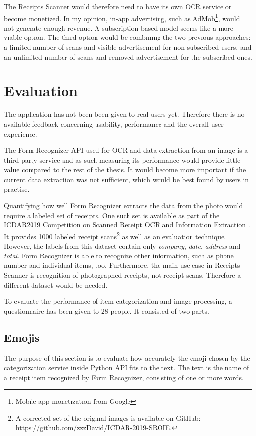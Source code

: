 \documentclass[
  digital, %
  table,   %
  oneside, %
  lof,     %
  lot,     %
]{fithesis3}
\begin{document}
The Receipts Scanner would therefore need to have its own OCR service or become monetized. In my opinion, in-app advertising, such as AdMob\footnote{Mobile app monetization from Google}, would not generate enough revenue. A subscription-based model seems like a more viable option. The third option would be combining the two previous approaches: a limited number of scans and visible advertisement for non-subscribed users, and an unlimited number of scans and removed advertisement for the subscribed ones.

\chapter{Evaluation}
The application has not been been given to real users yet. Therefore there is no available feedback concerning usability, performance and the overall user experience.

The Form Recognizer API used for OCR and data extraction from an image is a third party service and as such measuring its performance would provide little value compared to the rest of the thesis. It would become more important if the current data extraction was not sufficient, which would be best found by users in practise. 

Quantifying how well Form Recognizer extracts the data from the photo would require a labeled set of receipts. One such set is available as part of the ICDAR2019 Competition on Scanned Receipt OCR
and Information Extraction \cite{Huang2019ICDAR}. It provides \num{1000} labeled receipt scans\footnote{A corrected set of the original images is available on GitHub: \url{https://github.com/zzzDavid/ICDAR-2019-SROIE}.} as well as an evaluation technique. However, the labels from this dataset contain only \textit{company}, \textit{date}, \textit{address} and \textit{total}. Form Recognizer is able to recognize other information, such as phone number and individual items, too. Furthermore, the main use case in Receipts Scanner is recognition of photographed receipts, not receipt scans. Therefore a different dataset would be needed.

To evaluate the performance of item categorization and image processing, a questionnaire has been given to 28 people. It consisted of two parts.

\section{Emojis}
The purpose of this section is to evaluate how accurately the emoji chosen by the categorization service inside Python API fits to the text. The text is the name of a receipt item recognized by Form Recognizer, consisting of one or more words.
\end{document}
